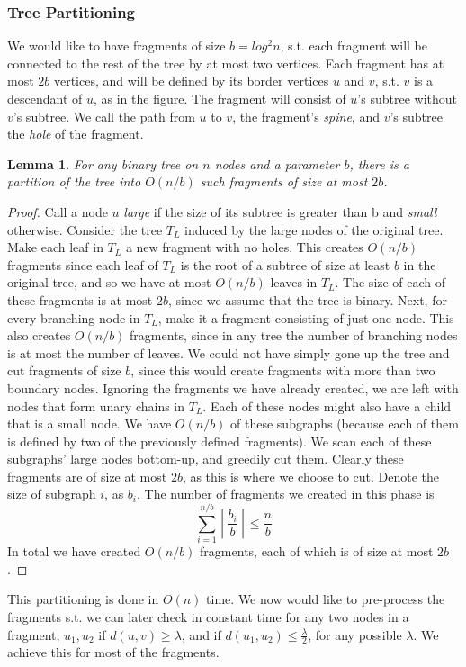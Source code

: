 \documentclass[11pt,a4paper]{article}
\newtheorem{lemma}{Lemma}
\theoremstyle{definition}
\theoremstyle{remark}
\begin{document}
\subsubsection{Tree Partitioning}
We would like to have fragments of size $b=log^2n$, s.t. each fragment will be connected to the rest of the tree by at most two vertices. Each fragment has at most $2b$ vertices, and will be defined by its border vertices $u$ and $v$, s.t. $v$ is a descendant of $u$, as in the figure. The fragment will consist of $u$'s subtree without $v$'s subtree. We call the path from $u$ to $v$, the fragment's \textit{spine}, and $v$'s subtree the \textit{hole} of the fragment. %
\begin{lemma}
For any binary tree on $n$ nodes and a parameter $b$, there is a partition of the tree into $O(n/b)$ such fragments of size at most $2b$.
\end{lemma}
\begin{proof}
Call a node $u$ \textit{large} if the size of its subtree is greater than b and \textit{small}
otherwise. Consider the tree $T_L$ induced by the large nodes of the original tree. Make each leaf in $T_L$ a new fragment with no holes. This creates $O(n/b)$ fragments since each leaf of $T_L$ is the root of a subtree of size at least $b$ in the original tree, and so we have at most $O(n/b)$ leaves in $T_L$. The size of each of these fragments is at most $2b$, since we assume that the tree is binary.
Next, for every branching node in $T_L$, make it a fragment consisting of just one node. This also creates $O(n/b)$ fragments, since in any tree the number of branching nodes is at most the number of leaves. We could not have simply gone up the tree and cut fragments of size $b$, since this would create fragments with more than two boundary nodes.
Ignoring the fragments we have already created, we are left with nodes that form unary chains in $T_L$. Each of these nodes might also have a child that is a small node. We have $O(n/b)$ of these subgraphs (because each of them is defined by two of the previously defined fragments). We scan each of these subgraphs' large nodes bottom-up, and greedily cut them. Clearly these fragments are of size at most $2b$, as this is where we choose to cut. Denote the size of subgraph $i$, as $b_i$. The number of fragments we created in this phase is $$\sum_{i=1}^{n/b} \left\lceil \frac{b_i}{b} \right\rceil \leq \frac{n}{b}$$
In total we have created $O(n/b)$ fragments, each of which is of size at most $2b$.
\end{proof}
This partitioning is done in $O(n)$ time.
We now would like to pre-process the fragments s.t. we can later check in constant time for any two nodes in a fragment, $u_1,u_2$ if $d(u,v)\geq\lambda$, and if $d(u_1,u_2) \leq \frac{\lambda}{2}$, for any possible $\lambda$. We achieve this for most of the fragments.
\end{document}
